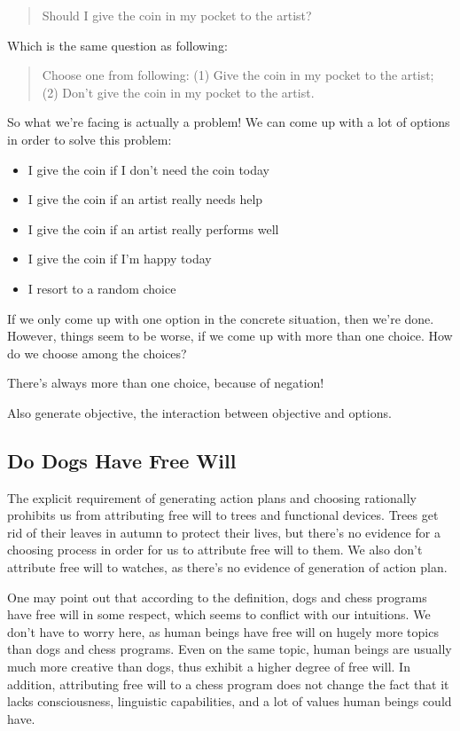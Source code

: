\begin{quote}
  Should I give the coin in my pocket to the artist?
\end{quote}

Which is the same question as following:

\begin{quote}
  Choose one from following: (1) Give the coin in my pocket to the artist; (2) Don't give the coin in my pocket to the artist.
\end{quote}

So what we're facing is actually a problem! We can come up with a lot of options in order to solve this problem:

\begin{itemize}
\item I give the coin if I don't need the coin today
\item I give the coin if an artist really needs help
\item I give the coin if an artist really performs well
\item I give the coin if I'm happy today
\item I resort to a random choice
\end{itemize}

If we only come up with one option in the concrete situation, then we're done. However,  things seem to be worse, if we come up with more than one choice. How do we choose among the choices?

There's always more than one choice, because of negation!

Also generate objective, the interaction between objective and options.

\subsection{Do Dogs Have Free Will}

The explicit requirement of generating action plans and choosing rationally prohibits us from attributing free will to trees and functional devices. Trees get rid of their leaves in autumn to protect their lives, but there’s no evidence for a choosing process in order for us to attribute free will to them. We also don’t attribute free will to watches, as there’s no evidence of generation of action plan.

One may point out that according to the definition, dogs and chess programs have free will in some respect, which seems to conflict with our intuitions. We don’t have to worry here, as human beings have free will on hugely more topics than dogs and chess programs. Even on the same topic, human beings are usually much more creative than dogs, thus exhibit a higher degree of free will. In addition, attributing free will to a chess program does not change the fact that it lacks consciousness, linguistic capabilities, and a lot of values human beings could have.


